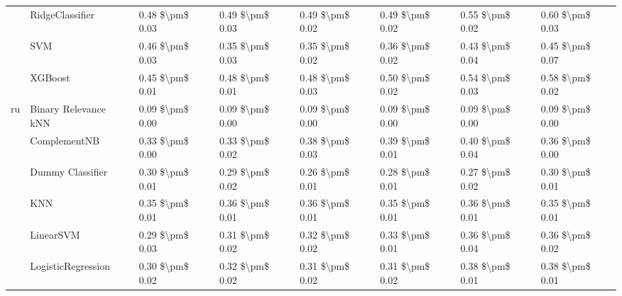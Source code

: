 \begin{tabular}{llllllll}
   & RidgeClassifier &  0.48 \$\textbackslash pm\$ 0.03 &           0.49 \$\textbackslash pm\$ 0.03 &       0.49 \$\textbackslash pm\$ 0.02 &        0.49 \$\textbackslash pm\$ 0.02 &                         0.55 \$\textbackslash pm\$ 0.02 &      0.60 \$\textbackslash pm\$ 0.03 \\
   & SVM &  0.46 \$\textbackslash pm\$ 0.03 &           0.35 \$\textbackslash pm\$ 0.03 &       0.35 \$\textbackslash pm\$ 0.02 &        0.36 \$\textbackslash pm\$ 0.02 &                         0.43 \$\textbackslash pm\$ 0.04 &      0.45 \$\textbackslash pm\$ 0.07 \\
   & XGBoost &  0.45 \$\textbackslash pm\$ 0.01 &           0.48 \$\textbackslash pm\$ 0.01 &       0.48 \$\textbackslash pm\$ 0.03 &        0.50 \$\textbackslash pm\$ 0.02 &                         0.54 \$\textbackslash pm\$ 0.03 &      0.58 \$\textbackslash pm\$ 0.02 \\
ru & Binary Relevance kNN &  0.09 \$\textbackslash pm\$ 0.00 &           0.09 \$\textbackslash pm\$ 0.00 &       0.09 \$\textbackslash pm\$ 0.00 &        0.09 \$\textbackslash pm\$ 0.00 &                         0.09 \$\textbackslash pm\$ 0.00 &      0.09 \$\textbackslash pm\$ 0.00 \\
   & ComplementNB &  0.33 \$\textbackslash pm\$ 0.00 &           0.33 \$\textbackslash pm\$ 0.02 &       0.38 \$\textbackslash pm\$ 0.03 &        0.39 \$\textbackslash pm\$ 0.01 &                         0.40 \$\textbackslash pm\$ 0.04 &      0.36 \$\textbackslash pm\$ 0.00 \\
   & Dummy Classifier &  0.30 \$\textbackslash pm\$ 0.01 &           0.29 \$\textbackslash pm\$ 0.02 &       0.26 \$\textbackslash pm\$ 0.01 &        0.28 \$\textbackslash pm\$ 0.01 &                         0.27 \$\textbackslash pm\$ 0.02 &      0.30 \$\textbackslash pm\$ 0.01 \\
   & KNN &  0.35 \$\textbackslash pm\$ 0.01 &           0.36 \$\textbackslash pm\$ 0.01 &       0.36 \$\textbackslash pm\$ 0.01 &        0.35 \$\textbackslash pm\$ 0.01 &                         0.36 \$\textbackslash pm\$ 0.01 &      0.35 \$\textbackslash pm\$ 0.01 \\
   & LinearSVM &  0.29 \$\textbackslash pm\$ 0.03 &           0.31 \$\textbackslash pm\$ 0.02 &       0.32 \$\textbackslash pm\$ 0.02 &        0.33 \$\textbackslash pm\$ 0.01 &                         0.36 \$\textbackslash pm\$ 0.04 &      0.36 \$\textbackslash pm\$ 0.02 \\
   & LogisticRegression &  0.30 \$\textbackslash pm\$ 0.02 &           0.32 \$\textbackslash pm\$ 0.02 &       0.31 \$\textbackslash pm\$ 0.02 &        0.31 \$\textbackslash pm\$ 0.02 &                         0.38 \$\textbackslash pm\$ 0.01 &      0.38 \$\textbackslash pm\$ 0.01 \\

\end{tabular}

